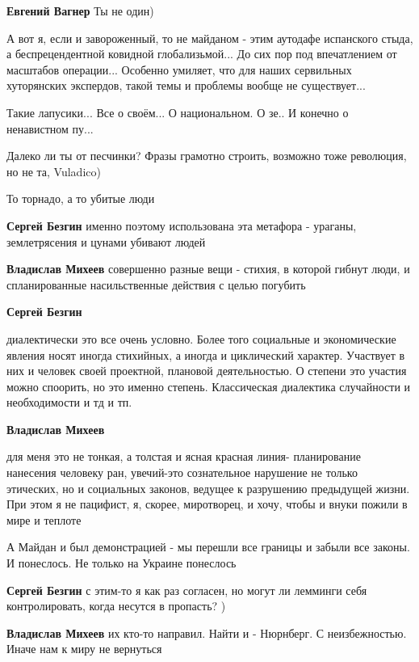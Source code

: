 \begin{itemize}
\begin{itemize}
\textbf{Евгений Вагнер} Ты не один)
\end{itemize} %


А вот я, если и завороженный, то не майданом - этим аутодафе испанского стыда,
а беспрецендентной ковидной глобализьмой... До сих пор под впечатлением от
масштабов операции... Особенно умиляет, что для наших сервильных хуторянских
экспердов, такой темы и проблемы вообще не существует...

Такие лапусики... Все о своём... О национальном. О зе.. И конечно о ненавистном
пу...

Далеко ли ты от песчинки? Фразы грамотно строить, возможно тоже революция, но не та, Vuladico)

То торнадо, а то убитые люди

\begin{itemize} %
\textbf{Сергей Безгин} именно поэтому использована эта метафора - ураганы, землетрясения и цунами убивают людей

\textbf{Владислав Михеев} совершенно разные вещи - стихия, в которой гибнут люди, и спланированные насильственные действия с целью погубить

\textbf{Сергей Безгин} 

диалектически это все очень условно. Более того социальные и экономические
явления носят иногда стихийных, а иногда и циклический характер. Участвует в
них и человек своей проектной, плановой деятельностью. О степени это участия
можно споорить, но это именно степень. Классическая диалектика случайности и
необходимости и тд и тп.

\textbf{Владислав Михеев} 

для меня это не тонкая, а толстая и ясная красная линия- планирование нанесения
человеку ран, увечий-это сознательное нарушение не только этических, но и
социальных законов, ведущее к разрушению предыдущей жизни. При этом я не
пацифист, я, скорее, миротворец, и хочу, чтобы и внуки пожили в мире и теплоте


А Майдан и был демонстрацией - мы перешли все границы и забыли все законы. И
понеслось. Не только на Украине понеслось

\textbf{Сергей Безгин} с этим-то я как раз согласен, но могут ли лемминги себя контролировать, когда несутся в пропасть? )

\textbf{Владислав Михеев} их кто-то направил. Найти и - Нюрнберг. С неизбежностью. Иначе нам к миру не вернуться
\end{itemize} %

\end{itemize} %
